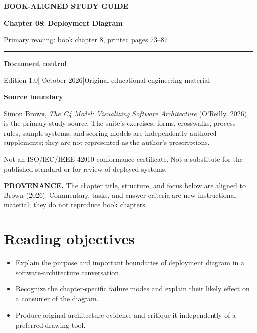 \documentclass[10pt,letterpaper]{article}
\newcommand{\SourceNote}[1]{\par\smallskip\noindent\colorbox{C4Light}{\parbox{0.94\linewidth}{\footnotesize\textbf{PROVENANCE.} #1}}\par\medskip}
\newcommand{\DocStart}[3]{%
\begin{document}
\begin{titlepage}
\renewcommand{\thepage}{title-\arabic{page}}
\vspace*{0.55in}
{\sffamily\bfseries\small\color{C4Teal}#1}\par\vspace{0.24in}
{\sffamily\bfseries\fontsize{26}{31}\selectfont\color{C4Navy}#2}\par\vspace{0.18in}
{\large\color{C4Gray}#3}\par\vspace{0.4in}
\textcolor{C4Teal}{\rule{\linewidth}{1.15pt}}\par\vspace{0.24in}
\textbf{Document control}\par
Edition 1.0\quad|\quad 30 October 2026\quad|\quad Original educational engineering material\par
\vspace{0.17in}
\textbf{Source boundary}\par
Simon Brown, \emph{The C4 Model: Visualizing Software Architecture} (O'Reilly, 2026), is the primary study source. The suite's exercises, forms, crosswalks, process rules, sample systems, and scoring models are independently authored supplements; they are not represented as the author's prescriptions.\par
\vfill
{\small\color{C4Gray}Not an ISO/IEC/IEEE 42010 conformance certificate. Not a substitute for the published standard or for review of deployed systems.}\par
\end{titlepage}
}
\DocStart{BOOK-ALIGNED STUDY GUIDE}{Chapter 08: Deployment Diagram}{Primary reading: book chapter 8, printed pages 73–87}
\SourceNote{The chapter title, structure, and focus below are aligned to Brown (2026). Commentary, tasks, and answer criteria are new instructional material; they do not reproduce book chapters.}
\section{Reading objectives}
\begin{itemize}
\item Explain the purpose and important boundaries of deployment diagram in a software-architecture conversation.
\item Recognize the chapter-specific failure modes and explain their likely effect on a consumer of the diagram.
\item Produce original architecture evidence and critique it independently of a preferred drawing tool.
\end{itemize}
\end{document}

